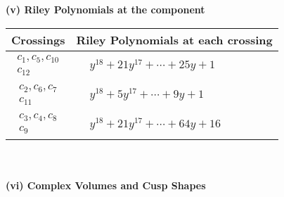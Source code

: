 \documentclass[1p]{elsarticle_modified}
\theoremstyle{definition}
\begin{document}
\newpage\renewcommand{\arraystretch}{1}
\flushleft \textbf{(v) Riley Polynomials at the component}\newline \\
\begin{tabular}{m{50pt}|m{274pt}}
Crossings & \hspace{64pt}Riley Polynomials at each crossing \\
\hline $$\begin{aligned}c_{1},c_{5},c_{10}\\c_{12}\end{aligned}$$&$\begin{aligned}
&y^{18}+21 y^{17}+\cdots+25 y+1
\end{aligned}$\\
\hline $$\begin{aligned}c_{2},c_{6},c_{7}\\c_{11}\end{aligned}$$&$\begin{aligned}
&y^{18}+5 y^{17}+\cdots+9 y+1
\end{aligned}$\\
\hline $$\begin{aligned}c_{3},c_{4},c_{8}\\c_{9}\end{aligned}$$&$\begin{aligned}
&y^{18}+21 y^{17}+\cdots+64 y+16
\end{aligned}$\\
\hline
\end{tabular}\\~\\
\newpage\flushleft \textbf{(vi) Complex Volumes and Cusp Shapes}
\end{document}
